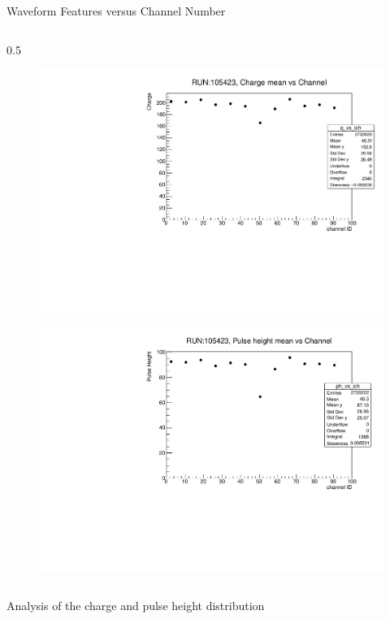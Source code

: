 \documentclass{beamer}[10pt]
\begin{document}
\begin{frame}{Waveform Features versus Channel Number}
\begin{columns}
\begin{column}{0.5\framewidth}
\begin{figure}[H]
   \centering
   \includegraphics[width= 1.0\columnwidth]{figures/pdf/q_vs_ch.pdf}
   \label{fig:wffytl}
 \end{figure}
\begin{figure}[H]
   \centering
   \includegraphics[width= 1.0\columnwidth]{figures/pdf/ph_vs_ch.pdf}
   \label{fig:wffytl}
 \end{figure}
\end{column}
\end{columns}
\end{frame}





\begin{frame}{Analysis of the charge and pulse height distribution}
\end{frame}
\end{document}
